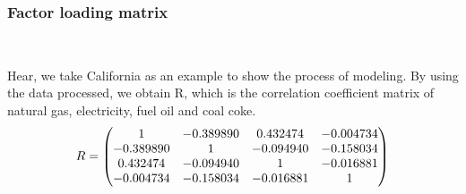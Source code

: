 \documentclass[a4paper,11pt]{article}
\begin{document}
\subsubsection{Factor loading matrix}
\textrm{\\}
\par Hear, we take California as an example to show the process of modeling. By using the data processed, we obtain R, which is the correlation coefficient matrix of natural gas, electricity, fuel oil and coal coke.
\begin{equation}
    \centering
R=\begin{pmatrix} 1 & -0.389890 & 0.432474 & -0.004734 \\ -0.389890 & 1 & -0.094940 &-0.158034 \\ 0.432474 & -0.094940 & 1 & -0.016881 \\ -0.004734 & -0.158034 & -0.016881 & 1\end{pmatrix}
\end{equation}
\end{document}
